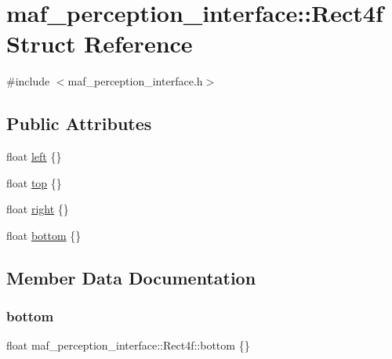 \hypertarget{structmaf__perception__interface_1_1Rect4f}{}\section{maf\+\_\+perception\+\_\+interface\+:\+:Rect4f Struct Reference}
\label{structmaf__perception__interface_1_1Rect4f}


{\ttfamily \#include $<$maf\+\_\+perception\+\_\+interface.\+h$>$}

\subsection*{Public Attributes}
\begin{DoxyCompactItemize}
\item 
float \hyperlink{structmaf__perception__interface_1_1Rect4f_a73af1552cd2a4dd351eee94244cc4f1b}{left} \{\}
\item 
float \hyperlink{structmaf__perception__interface_1_1Rect4f_a421208599d36469e89431378c8333e59}{top} \{\}
\item 
float \hyperlink{structmaf__perception__interface_1_1Rect4f_ae417e4b72c8c000947ba54a6daea1990}{right} \{\}
\item 
float \hyperlink{structmaf__perception__interface_1_1Rect4f_a7b9fa782142c47e07d4159d6eb34ef4c}{bottom} \{\}
\end{DoxyCompactItemize}


\subsection{Member Data Documentation}
\mbox{\label{structmaf__perception__interface_1_1Rect4f_a7b9fa782142c47e07d4159d6eb34ef4c}} 
\subsubsection{\texorpdfstring{bottom}{bottom}}
{\footnotesize\ttfamily float maf\+\_\+perception\+\_\+interface\+::\+Rect4f\+::bottom \{\}}

\mbox{\label{structmaf__perception__interface_1_1Rect4f_a73af1552cd2a4dd351eee94244cc4f1b}} 
